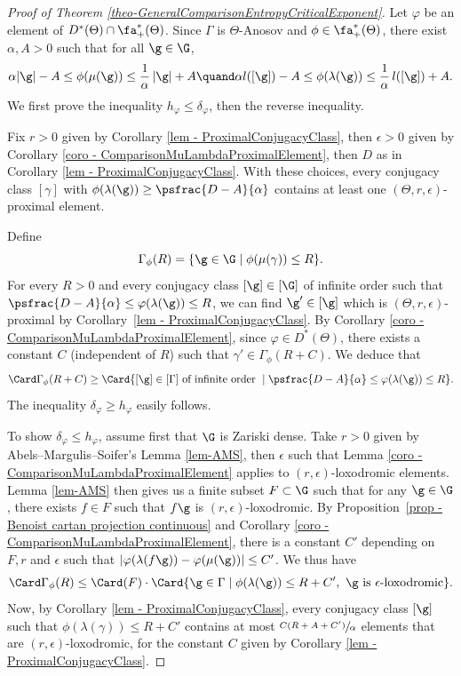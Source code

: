 \begin{proof}[Proof of Theorem \ref{theo-GeneralComparisonEntropyCriticalExponent}]

\Changel

Let $\varphi$ be an element of $D^*(\Theta)\cap \fa_+^*(\Theta)$. Since $\Gamma$ is $\Theta$-Anosov and $\phi \in \fa_+^*(\Theta)$, there exist $\alpha, A>0$ such that for all $\g \in \G$,
\[\alpha \vert \g \vert - A \leq \phi(\mu(\g)) \leq \frac{1}{\alpha}\,\vert \g \vert + A\quand
\alpha l([\g]) - A \leq \phi(\lambda(\g)) \leq \frac{1}{\alpha}\,l([\g]) + A.\]
We first prove the inequality $h_\varphi \leq \delta_\varphi$, then the reverse inequality.

\Changelback

Fix $r>0$ given by Corollary \ref{lem - ProximalConjugacyClass}, then $\epsilon>0$ given by Corollary \ref{coro - ComparisonMuLambdaProximalElement}, then $D$ as in Corollary \ref{lem - ProximalConjugacyClass}. With these choices, every conjugacy class $[\gamma]$ with $\phi(\lambda(\g)) \geq \psfrac{D-A}{\alpha}$ contains at least one $(\Theta,r,\epsilon)$-proximal element.

Define
\[\Gamma_\phi(R) =\{\g \in \G \mid \phi(\mu(\gamma)) \leq R\}.\]
For every $R>0$ and every conjugacy class $[\g] \in [\G]$ of infinite order such that $\psfrac{D-A}{\alpha}\leq \varphi(\lambda(\g)) \leq R$, we can find $\g' \in [\g]$ which is $(\Theta,r,\epsilon)$-proximal by Corollary~\ref{lem - ProximalConjugacyClass}. By Corollary \ref{coro - ComparisonMuLambdaProximalElement}, since $\varphi \in D^*(\Theta)$, there exists a constant $C$ (independent of $R$) such that $\gamma' \in \Gamma_\phi(R+C)$. We deduce that
\[\Card \Gamma_\phi(R+C) \geq \Card \{[\g] \in [\Gamma] \textrm{ of infinite order } \mid \psfrac{D-A}{\alpha}\leq \varphi(\lambda(\g))\leq R\}.\]
The inequality $\delta_\varphi \geq h_\varphi$ easily follows.

To show $\delta_\varphi \leq h_\varphi$, assume first that $\G$ is Zariski dense. Take $r>0$ given by Abels--Margulis--Soifer's Lemma \ref{lem-AMS}, then $\epsilon$ such that Lemma \ref{coro - ComparisonMuLambdaProximalElement} applies to $(r,\epsilon)$\nobreakdash-loxo\-dromic elements. Lemma \ref{lem-AMS} then gives us a finite subset $F\subset \G $ such that for any $\g\in \G$, there exists $f\in F$ such that $f\g$ is $(r,\epsilon)$-loxodromic. By Proposition~\ref{prop - Benoist cartan projection continuous} and Corollary \ref{coro - ComparisonMuLambdaProximalElement}, there is a constant $C'$ depending on $F, r$ and $\epsilon$ such that \hbox{$|\varphi(\lambda(f\g)) - \varphi(\mu(\g))|\leq C'$}. We thus have
\[
\Card\Gamma_\phi(R) \leq \Card(F) \cdot \Card\{ \g \in \Gamma \mid \phi(\lambda(\g)) \leq R+C', \textrm{ $\g$ is $\epsilon$-loxodromic}\}.\]
Now, by Corollary \ref{lem - ProximalConjugacyClass}, every conjugacy class $[\g]$ such that $\phi(\lambda(\gamma)) \leq R+C'$ contains at most $\sfrac{C(R+A+C')}{\alpha}$ elements that are $(r,\epsilon)$-loxodromic, for the constant $C$ given by Corollary \ref{lem - ProximalConjugacyClass}.


\end{proof}
